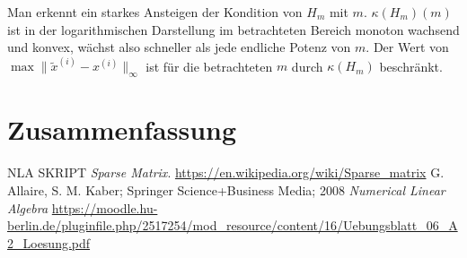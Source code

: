 \documentclass[smallheadings]{scrartcl}
\numberwithin{equation}{section}
\begin{document}
Man erkennt ein starkes Ansteigen der Kondition von $H_m$ mit $m$. $\kappa(H_m)(m)$ ist in der logarithmischen Darstellung im betrachteten Bereich monoton wachsend und konvex, wächst also schneller als jede endliche Potenz von $m$. Der Wert von $\max\|\tilde{x}^{(i)}-x^{(i)}\|_\infty$ ist für die betrachteten $m$ durch $\kappa(H_m)$ beschränkt.






\section{Zusammenfassung}

\begin{thebibliography}{9}
 NLA SKRIPT \textit{Sparse Matrix}. 
\url{https://en.wikipedia.org/wiki/Sparse_matrix}
 G. Allaire, S. M. Kaber; Springer Science+Business Media; 2008 \textit{Numerical Linear Algebra}
\url{https://moodle.hu-berlin.de/pluginfile.php/2517254/mod_resource/content/16/Uebungsblatt_06_A2_Loesung.pdf}
\end{thebibliography}


\end{document}
